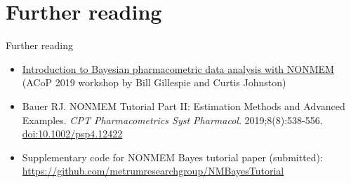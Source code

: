 \documentclass{beamer}
\begin{document}



\section{Further reading}

\begin{frame}{Further reading}

  \begin{itemize}
    \item \href{https://metrumrg.com/course/introduction-to-bayesian-pharmacometric-data-analysis-with-nonmem/}{Introduction to Bayesian pharmacometric data analysis with NONMEM} (ACoP 2019 workshop by Bill Gillespie and Curtis Johnston)
    \item Bauer RJ. NONMEM Tutorial Part II: Estimation Methods and Advanced Examples. \emph{CPT Pharmacometrics Syst Pharmacol}. 2019;8(8):538-556. \href{https://doi.org/10.1002/psp4.12422}{doi:10.1002/psp4.12422}
    \item Supplementary code for NONMEM Bayes tutorial paper (submitted): \url{https://github.com/metrumresearchgroup/NMBayesTutorial}
  \end{itemize}
\end{frame}
\end{document}
